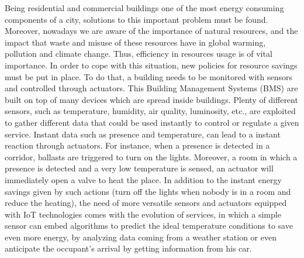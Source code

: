 Being residential and commercial buildings one of the most energy consuming components\cite{perezLombard2008energy} of a city, solutions to this important problem must be found.
Moreover, nowadays we are aware of the importance of natural resources, and the impact that waste and misuse of these resources have in global warming, pollution and climate change.
Thus, efficiency in resources usage is of vital importance.
In order to cope with this situation, new policies for resource savings must be put in place.
To do that, a building needs to be monitored with sensors and controlled through actuators.
This Building Management Systems (BMS) are built on top of many devices which are spread inside buildings.
Plenty of different sensors, such as temperature, humidity, air quality, luminosity, etc., are exploited to gather different data that could be used instantly to control or regulate a given service.
Instant data such as presence and temperature, can lead to a instant reaction through actuators.
For instance, when a presence is detected in a corridor, ballasts are triggered to turn on the lights.
Moreover, a room in which a presence is detected and a very low temperature is sensed, an actuator will immediately open a valve to heat the place.
In addition to the instant energy savings given by such actions (turn off the lights when nobody is in a room and reduce the heating), the need of more versatile sensors and actuators equipped with IoT technologies comes with the evolution of services, in which a simple sensor can embed algorithms to predict the ideal temperature conditions to save even more energy, by analyzing data coming from a weather station or even anticipate the occupant's arrival by getting information from his car.

